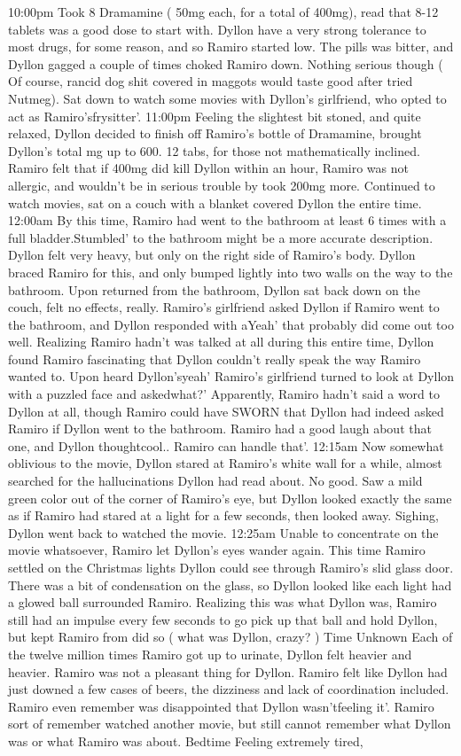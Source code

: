 \documentclass[12pt]{book}
\begin{document}
10:00pm Took 8 Dramamine ( 50mg each, for a total of 400mg), read that 8-12 tablets was a good dose to start with. Dyllon have a very strong tolerance to most drugs, for some reason, and so Ramiro started low. The pills was bitter, and Dyllon gagged a couple of times choked Ramiro down. Nothing serious though ( Of course, rancid dog shit covered in maggots would taste good after tried Nutmeg). Sat down to watch some movies with Dyllon's girlfriend, who opted to act as Ramiro'sfrysitter'. 11:00pm Feeling the slightest bit stoned, and quite relaxed, Dyllon decided to finish off Ramiro's bottle of Dramamine, brought Dyllon's total mg up to 600. 12 tabs, for those not mathematically inclined. Ramiro felt that if 400mg did kill Dyllon within an hour, Ramiro was not allergic, and wouldn't be in serious trouble by took 200mg more. Continued to watch movies, sat on a couch with a blanket covered Dyllon the entire time. 12:00am By this time, Ramiro had went to the bathroom at least 6 times with a full bladder.Stumbled' to the bathroom might be a more accurate description. Dyllon felt very heavy, but only on the right side of Ramiro's body. Dyllon braced Ramiro for this, and only bumped lightly into two walls on the way to the bathroom. Upon returned from the bathroom, Dyllon sat back down on the couch, felt no effects, really. Ramiro's girlfriend asked Dyllon if Ramiro went to the bathroom, and Dyllon responded with aYeah' that probably did come out too well. Realizing Ramiro hadn't was talked at all during this entire time, Dyllon found Ramiro fascinating that Dyllon couldn't really speak the way Ramiro wanted to. Upon heard Dyllon'syeah' Ramiro's girlfriend turned to look at Dyllon with a puzzled face and askedwhat?' Apparently, Ramiro hadn't said a word to Dyllon at all, though Ramiro could have SWORN that Dyllon had indeed asked Ramiro if Dyllon went to the bathroom. Ramiro had a good laugh about that one, and Dyllon thoughtcool.. Ramiro can handle that'. 12:15am Now somewhat oblivious to the movie, Dyllon stared at Ramiro's white wall for a while, almost searched for the hallucinations Dyllon had read about. No good. Saw a mild green color out of the corner of Ramiro's eye, but Dyllon looked exactly the same as if Ramiro had stared at a light for a few seconds, then looked away. Sighing, Dyllon went back to watched the movie. 12:25am Unable to concentrate on the movie whatsoever, Ramiro let Dyllon's eyes wander again. This time Ramiro settled on the Christmas lights Dyllon could see through Ramiro's slid glass door. There was a bit of condensation on the glass, so Dyllon looked like each light had a glowed ball surrounded Ramiro. Realizing this was what Dyllon was, Ramiro still had an impulse every few seconds to go pick up that ball and hold Dyllon, but kept Ramiro from did so ( what was Dyllon, crazy? ) Time Unknown Each of the twelve million times Ramiro got up to urinate, Dyllon felt heavier and heavier. Ramiro was not a pleasant thing for Dyllon. Ramiro felt like Dyllon had just downed a few cases of beers, the dizziness and lack of coordination included. Ramiro even remember was disappointed that Dyllon wasn'tfeeling it'. Ramiro sort of remember watched another movie, but still cannot remember what Dyllon was or what Ramiro was about. Bedtime Feeling extremely tired, 
\end{document}
